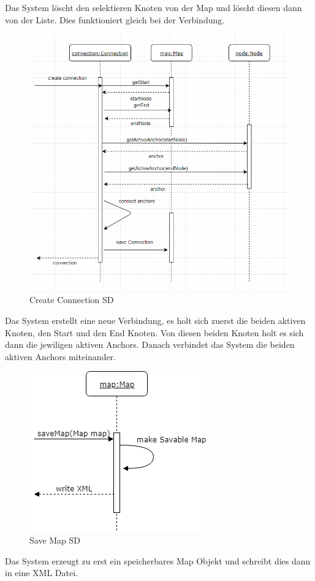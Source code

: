 Das System löscht den selektieren Knoten von der Map und löscht diesen dann von der Liste. 
Dies funktioniert gleich bei der Verbindung.

\begin{figure}[H]
	\centering
		\includegraphics[scale=0.6]{images/connectionSD.PNG}
	\caption{Create Connection SD}
	\label{fig:create_connection_SD}
\end{figure}
Das System erstellt eine neue Verbindung, es holt sich zuerst die beiden aktiven Knoten, den Start 
und den End Knoten. Von diesen beiden Knoten holt es sich dann die jewiligen aktiven Anchors. Danach
verbindet das System die beiden aktiven Anchors miteinander.

\begin{figure}[H]
	\centering
		\includegraphics[scale=0.6]{images/savemapSD.png}
	\caption{Save Map SD}
	\label{fig:savemap_SD}
\end{figure}
Das System erzeugt zu erst ein speicherbares Map Objekt und schreibt dies dann in eine XML Datei.

